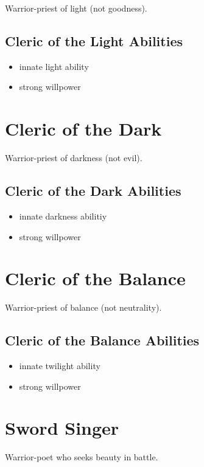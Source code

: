 \begin{multicols}{2}
Warrior-priest of light (not goodness).

\subsection{Cleric of the Light Abilities}

\begin{itemize}
    \item innate light ability
    \item strong willpower
\end{itemize}

\section{Cleric of the Dark}

Warrior-priest of darkness (not evil).

\subsection{Cleric of the Dark Abilities}

\begin{itemize}
    \item innate darkness abilitiy
    \item strong willpower
\end{itemize}

\section{Cleric of the Balance}

Warrior-priest of balance (not neutrality).

\subsection{Cleric of the Balance Abilities}

\begin{itemize}
    \item innate twilight ability
    \item strong willpower
\end{itemize}

\section{Sword Singer}

Warrior-poet who seeks beauty in battle.


\end{multicols}
